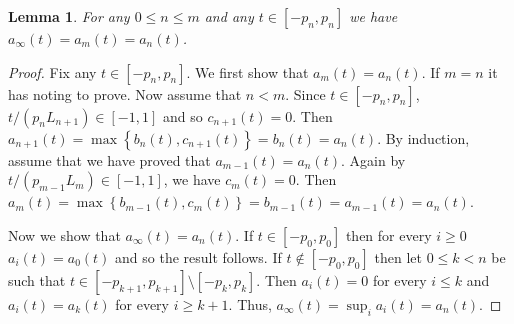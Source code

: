 \documentclass[reqno,a4paper,12pt]{amsart}
\newtheorem{lem}[thm]{Lemma}
\theoremstyle{definition}
\numberwithin{equation}{section}
\begin{document}
\begin{lem}\label{lem:copy_up}
For any $0\leq n\leq m$ and any $t\in [-p_n,p_n]$ we have $a_\infty(t)=a_m(t)=a_n(t)$.
\end{lem}
\begin{proof}
Fix any $t\in [-p_n,p_n]$.
We first show that $a_m(t)=a_n(t)$.
If $m=n$ it has noting to prove. Now assume that $n<m$.
Since $t\in [-p_n,p_n]$, $t/(p_nL_{n+1})\in[-1,1]$ and so $c_{n+1}(t)=0$.
Then $a_{n+1}(t)=\max {\left\{{b_n(t),c_{n+1}(t)}\right\}}=b_n(t)=a_n(t)$.
By induction, assume that we have proved that $a_{m-1}(t)=a_n(t)$.
Again by $t/(p_{m-1}L_{m})\in[-1,1]$, we have $c_{m}(t)=0$.
Then $a_{m}(t)=\max {\left\{{b_{m-1}(t),c_{m}(t)}\right\}}=b_{m-1}(t)=a_{m-1}(t)=a_{n}(t)$.

Now we show that $a_\infty(t)=a_n(t)$.
If $t\in [-p_0,p_0]$ then for every $i\geq 0$ $a_i(t)=a_0(t)$ and so the result follows.
If $t\not\in [-p_0,p_0]$ then let $0\leq k<n$ be such that
$t\in [-p_{k+1},p_{k+1}]\setminus [-p_{k},p_{k}]$. Then $a_i(t)=0$ for every $i\leq k$
and $a_i(t)=a_k(t)$ for every $i\geq {k+1}$.
Thus, $a_\infty(t)=\sup_{i} a_i(t)=a_n(t)$.
\end{proof}
\end{document}
